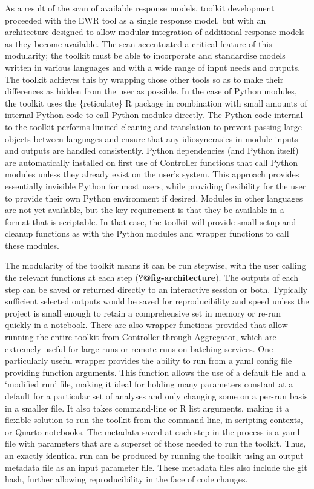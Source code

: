 \documentclass[
  number]{elsarticle}
\begin{document}
As a result of the scan of available response models, toolkit
development proceeded with the EWR tool as a single response model, but
with an architecture designed to allow modular integration of additional
response models as they become available. The scan accentuated a
critical feature of this modularity; the toolkit must be able to
incorporate and standardise models written in various languages and with
a wide range of input needs and outputs. The toolkit achieves this by
wrapping those other tools so as to make their differences as hidden
from the user as possible. In the case of Python modules, the toolkit
uses the \{reticulate\} R package \citep{ushey2023} in combination with
small amounts of internal Python code to call Python modules directly.
The Python code internal to the toolkit performs limited cleaning and
translation to prevent passing large objects between languages and
ensure that any idiosyncrasies in module inputs and outputs are handled
consistently. Python dependencies (and Python itself) are automatically
installed on first use of Controller functions that call Python modules
unless they already exist on the user's system. This approach provides
essentially invisible Python for most users, while providing flexibility
for the user to provide their own Python environment if desired. Modules
in other languages are not yet available, but the key requirement is
that they be available in a format that is scriptable. In that case, the
toolkit will provide small setup and cleanup functions as with the
Python modules and wrapper functions to call these modules.

The modularity of the toolkit means it can be run stepwise, with the
user calling the relevant functions at each step
(\textbf{?@fig-architecture}). The outputs of each step can be saved or
returned directly to an interactive session or both. Typically
sufficient selected outputs would be saved for reproducibility and speed
unless the project is small enough to retain a comprehensive set in
memory or re-run quickly in a notebook. There are also wrapper functions
provided that allow running the entire toolkit from Controller through
Aggregator, which are extremely useful for large runs or remote runs on
batching services. One particularly useful wrapper provides the ability
to run from a yaml config file providing function arguments. This
function allows the use of a default file and a `modified run' file,
making it ideal for holding many parameters constant at a default for a
particular set of analyses and only changing some on a per-run basis in
a smaller file. It also takes command-line or R list arguments, making
it a flexible solution to run the toolkit from the command line, in
scripting contexts, or Quarto notebooks. The metadata saved at each step
in the process is a yaml file with parameters that are a superset of
those needed to run the toolkit. Thus, an exactly identical run can be
produced by running the toolkit using an output metadata file as an
input parameter file. These metadata files also include the git hash,
further allowing reproducibility in the face of code changes.
\end{document}
